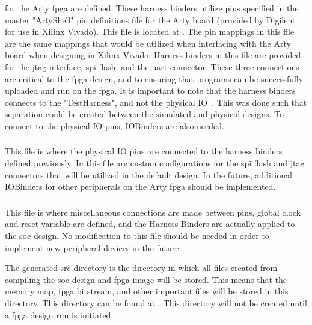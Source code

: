  for the Arty \Gls{fpga} are defined.
These harness binders utilize pins specified in the master "ArtyShell" pin definitions file for the Arty board (provided by Digilent for use in Xilinx Vivado).
This file is located at .
The pin mappings in this file are the same mappings that would be utilized when interfacing with the Arty board when designing in Xilinx Vivado.
Harness binders in this file are provided for the \Gls{jtag} interface, \Gls{spi} flash, and the \Gls{uart}  connector.
These three connections are critical to the \Gls{fpga} design, and to ensuring that programs can be successfully uploaded and run on the \Gls{fpga}.
It is important to note that the harness binders connects to the "TestHarness", and not the physical IO~\cite{Chipyard_IO}.
This was done such that separation could be created between the simulated and physical designs.
To connect to the physical IO pins, IOBinders are also needed.

\subsubsection{}\label{sec:Customizing_FPGA-IOBinders.scala}
This file is where the physical IO pins are connected to the harness binders defined previously.
In this file are custom configurations for the \Gls{spi} flash and \Gls{jtag} connectors that will be utilized in the default design.
In the future, additional IOBinders for other peripherals on the Arty \Gls{fpga} should be implemented.

\subsubsection{}\label{sec:Customizing_FPGA-TestHarness.scala}
This file is where miscellaneous connections are made between pins, global clock and reset variable are defined, and the Harness Binders are actually applied to the \Gls{soc} design.
No modification to this file should be needed in order to implement new peripheral devices in the future.


The generated-src directory is the directory in which all files created from compiling the \Gls{soc} design and \Gls{fpga} image will be stored.
This means that the memory map, \Gls{fpga} bitstream, and other important files will be stored in this directory.
This directory can be found at .
This directory will not be created until a \Gls{fpga} design run is initiated.


